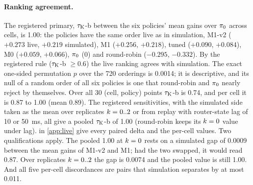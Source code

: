 \paragraph{Ranking agreement.}
The registered primary, $\tau_{\mathrm{K}}$-b between the six policies' mean gains over $\pi_{0}$ across
cells, is 1.00: the policies have the same order live as in simulation, M1-v2 ($+0.273$ live,
$+0.219$ simulated), M1 ($+0.256$, $+0.218$), tuned  ($+0.090$, $+0.084$), M0
($+0.059$, $+0.066$), $\pi_{0}$ (0) and round-robin ($-0.295$, $-0.332$). By the registered rule
($\tau_{\mathrm{K}}$-b $\geq 0.6$) the live ranking agrees with simulation. The exact one-sided permutation
$p$ over the 720 orderings is 0.0014; it is descriptive, and its null of a random order of all six
policies is one that round-robin and $\pi_{0}$ nearly reject by themselves. Over all 30 (cell, policy)
points $\tau_{\mathrm{K}}$-b is 0.74, and per cell it is 0.87 to 1.00 (mean 0.89). The registered
sensitivities, with the simulated side taken as the mean over replicates $k = 0..2$ or from replay
with router-state lag of 10 or \SI{50}{ms}, all give a pooled $\tau_{\mathrm{K}}$-b of 1.00 (round-robin keeps
its $k = 0$ value under lag).  in \cref{app:live} give every
paired delta and the per-cell values.
Two qualifications apply. The pooled 1.00 at $k = 0$ rests on a simulated gap of 0.0009 between
the mean gains of M1-v2 and M1; had the two swapped, it would read 0.87. Over replicates
$k = 0..2$ the gap is 0.0074 and the pooled value is still 1.00. And all five per-cell
discordances are pairs that simulation separates by at most 0.011.

